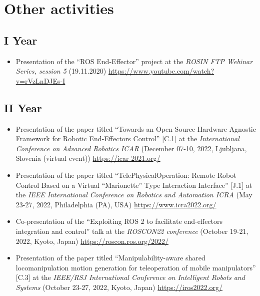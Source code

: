 \section{Other activities}
\subsection{\textbf{I Year}}
\begin{itemize}
	\item Presentation of the \enquote{ROS End-Effector} project at the \textit{ROSIN FTP Webinar Series, session 5}
	(19.11.2020) \url{https://www.youtube.com/watch?v=rVzLnDJEs-I}
\end{itemize}

\subsection{\textbf{II Year}}
\begin{itemize}
	\item Presentation of the paper titled \enquote{Towards an Open-Source Hardware Agnostic Framework for Robotic End-Effectors Control} [C.1] at the \textit{International Conference on Advanced Robotics ICAR} (December 07-10, 2022, Ljubljana, Slovenia (virtual event)) \url{https://icar-2021.org/}
	
	\item Presentation of the paper titled \enquote{TelePhysicalOperation: Remote Robot Control Based on a Virtual “Marionette” Type Interaction Interface} [J.1] at the \textit{IEEE International Conference on Robotics and Automation ICRA} (May 23-27, 2022, Philadelphia (PA), USA)
	\url{https://www.icra2022.org/}
	
	\item Co-presentation of the \enquote{Exploiting ROS 2 to facilitate end-effectors integration and control} talk at the \textit{ROSCON22 conference} (October 19-21, 2022, Kyoto, Japan) \url{https://roscon.ros.org/2022/}
	
	\item Presentation of the paper titled \enquote{Manipulability-aware shared locomanipulation motion generation for teleoperation of mobile manipulators} [C.3] at the \textit{IEEE/RSJ International Conference on Intelligent Robots and Systems} (October 23-27, 2022, Kyoto, Japan)
	\url{https://iros2022.org/}
\end{itemize}


